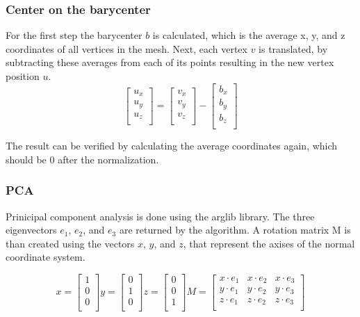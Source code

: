 \documentclass{bigdata}
\begin{document}
\subsubsection{Center on the barycenter}

For the first step the barycenter $b$ is calculated, which is the average x, y, and z coordinates of all vertices in the mesh. Next, each vertex $v$ is translated, by subtracting these averages from each of its points resulting in the new vertex position $u$.
\[
\begin{bmatrix}
u_x \\
u_y \\
u_z \\
\end{bmatrix}
=
\begin{bmatrix}
v_x \\
v_y \\
v_z \\
\end{bmatrix}
-
\begin{bmatrix}
b_x \\
b_y \\
b_z \\
\end{bmatrix}
\]

The result can be verified by calculating the average coordinates again, which should be 0 after the normalization.

\subsubsection{PCA}
Prinicipal component analysis is done using the arglib library. The three eigenvectors $e_1$, $e_2$, and $e_3$ are returned by the algorithm. A rotation matrix M is than created using the vectors $x$, $y$, and $z$, that represent the axises of the normal coordinate system.

\[
x = 
\begin{bmatrix}
1 \\
0 \\
0 \\
\end{bmatrix}
y =
\begin{bmatrix}
0 \\
1 \\
0 \\
\end{bmatrix}
z =
\begin{bmatrix}
0 \\
0 \\
1 \\
\end{bmatrix}
M =
\begin{bmatrix}
x \cdot e_1 & x \cdot e_2 & x \cdot e_3 \\
y \cdot e_1 & y \cdot e_2 & y \cdot e_3 \\
z \cdot e_1 & z \cdot e_2 & z \cdot e_3 \\
\end{bmatrix}
\]
\end{document}
